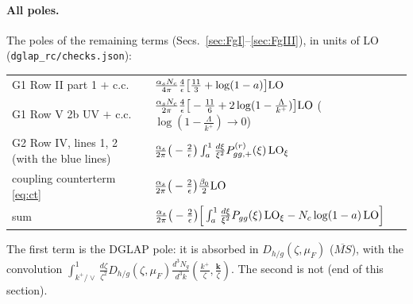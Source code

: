 \documentclass[10pt]{article}
\numberwithin{equation}{section}
\begin{document}
\paragraph{All poles.} The poles of the remaining terms (Secs.~\ref{sec:FgI}--\ref{sec:FgIII}), in units of LO (\texttt{dglap\_rc/checks.json}):
\begin{center}\small
\begin{tabular}{@{}ll@{}}\hline
G1 Row II part 1 $+$ c.c. & $\frac{\alpha_sN_c}{4\pi}\frac{4}{\epsilon}\big[\frac{11}{3}+\log(1-a)\big]{\rm LO}$\\
G1 Row V 2b UV $+$ c.c. & $\frac{\alpha_sN_c}{2\pi}\frac{4}{\epsilon}\big[-\frac{11}{6}+2\log(1-\frac{\Lambda}{k^+})\big]{\rm LO}$ \quad($\log(1-\frac{\Lambda}{k^+})\to0$)\\
G2 Row IV, lines 1, 2 (with the blue lines) & $\frac{\alpha_s}{2\pi}\big(-\frac{2}{\epsilon}\big)\int_a^1\frac{d\xi}{\xi^2}P^{(r)}_{gg,+}(\xi)\,{\rm LO}_\xi$\\
coupling counterterm \eqref{eq:ct} & $\frac{\alpha_s}{2\pi}\big(-\frac{2}{\epsilon}\big)\frac{\beta_0}{2}{\rm LO}$\\\hline
sum & $\frac{\alpha_s}{2\pi}\big(-\frac{2}{\epsilon}\big)\Big[\int_a^1\frac{d\xi}{\xi^2}P_{gg}(\xi)\,{\rm LO}_\xi-N_c\log(1-a)\,{\rm LO}\Big]$\\\hline
\end{tabular}
\end{center}
The first term is the DGLAP pole: it is absorbed in $D_{h/g}(\zeta,\mu_F)$ ($\overline{MS}$), with the convolution $\int_{k^+/\vee}^1\frac{d\zeta}{\zeta^2}D_{h/g}(\zeta,\mu_F)\frac{d^3N_g}{d^3k}(\frac{k^+}{\zeta},\frac{\mathbf k}{\zeta})$. The second is not (end of this section).
\end{document}
